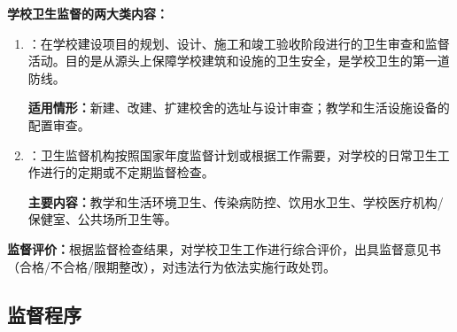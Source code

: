 \begin{defbox}
\textbf{学校卫生监督的两大类内容：}

\begin{enumerate}[leftmargin=*]
    \item {}：在学校建设项目的规划、设计、施工和竣工验收阶段进行的卫生审查和监督活动。目的是从源头上保障学校建筑和设施的卫生安全，是学校卫生的第一道防线。

    \textbf{适用情形：}新建、改建、扩建校舍的选址与设计审查；教学和生活设施设备的配置审查。

    \item {}：卫生监督机构按照国家年度监督计划或根据工作需要，对学校的日常卫生工作进行的定期或不定期监督检查。

    \textbf{主要内容：}教学和生活环境卫生、传染病防控、饮用水卫生、学校医疗机构/保健室、公共场所卫生等。
\end{enumerate}

\textbf{监督评价：}根据监督检查结果，对学校卫生工作进行综合评价，出具监督意见书（合格/不合格/限期整改），对违法行为依法实施行政处罚。
\end{defbox}

\subsection{监督程序}

